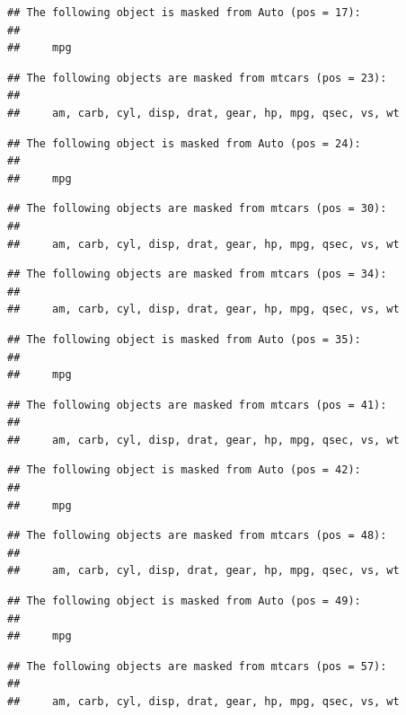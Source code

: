 \documentclass[]{book}
\begin{document}
\begin{verbatim}
## The following object is masked from Auto (pos = 17):
## 
##     mpg
\end{verbatim}

\begin{verbatim}
## The following objects are masked from mtcars (pos = 23):
## 
##     am, carb, cyl, disp, drat, gear, hp, mpg, qsec, vs, wt
\end{verbatim}

\begin{verbatim}
## The following object is masked from Auto (pos = 24):
## 
##     mpg
\end{verbatim}

\begin{verbatim}
## The following objects are masked from mtcars (pos = 30):
## 
##     am, carb, cyl, disp, drat, gear, hp, mpg, qsec, vs, wt
\end{verbatim}

\begin{verbatim}
## The following objects are masked from mtcars (pos = 34):
## 
##     am, carb, cyl, disp, drat, gear, hp, mpg, qsec, vs, wt
\end{verbatim}

\begin{verbatim}
## The following object is masked from Auto (pos = 35):
## 
##     mpg
\end{verbatim}

\begin{verbatim}
## The following objects are masked from mtcars (pos = 41):
## 
##     am, carb, cyl, disp, drat, gear, hp, mpg, qsec, vs, wt
\end{verbatim}

\begin{verbatim}
## The following object is masked from Auto (pos = 42):
## 
##     mpg
\end{verbatim}

\begin{verbatim}
## The following objects are masked from mtcars (pos = 48):
## 
##     am, carb, cyl, disp, drat, gear, hp, mpg, qsec, vs, wt
\end{verbatim}

\begin{verbatim}
## The following object is masked from Auto (pos = 49):
## 
##     mpg
\end{verbatim}

\begin{verbatim}
## The following objects are masked from mtcars (pos = 57):
## 
##     am, carb, cyl, disp, drat, gear, hp, mpg, qsec, vs, wt
\end{verbatim}
\end{document}
